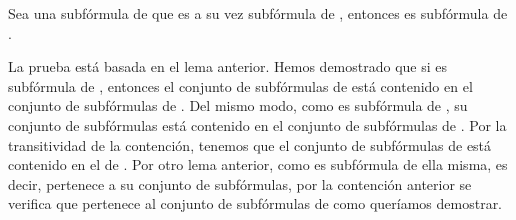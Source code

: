 \begin{isabellebody}
\begin{isamarkuptext}
  \begin{lema}
    Sea  una subfórmula de  que es a su vez subfórmula de , 
    entonces  es subfórmula de .
  \end{lema}

  \begin{demostracion}
  La prueba está basada en el lema anterior. Hemos demostrado que si 
   es subfórmula de , entonces el conjunto de subfórmulas de  
  está contenido en el conjunto de subfórmulas de . Del mismo modo, 
  como  es subfórmula de , su conjunto de subfórmulas está 
  contenido en el conjunto de subfórmulas de . Por la
  transitividad de la contención, tenemos que el conjunto de subfórmulas
  de  está contenido en el de . Por otro lema anterior, 
  como  es subfórmula de ella misma, es decir, pertenece a su 
  conjunto de subfórmulas, por la contención anterior se verifica que
  pertenece al conjunto de subfórmulas de  como queríamos demostrar. 
  \end{demostracion}


\end{isamarkuptext}
\end{isabellebody}
